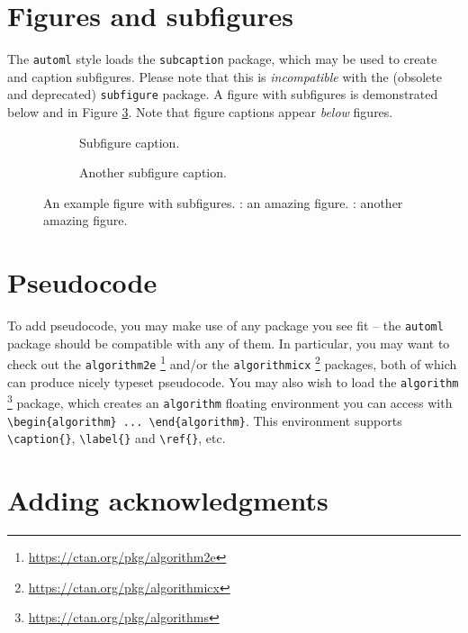 \documentclass[11pt]{article}
\begin{document}
\section{Figures and subfigures}

The \texttt{automl} style loads the \texttt{subcaption} package, which may be
used to create and caption subfigures. Please note that this is
\emph{incompatible} with the (obsolete and deprecated) \texttt{subfigure}
package. A figure with subfigures is demonstrated below and in Figure
\ref{example_figure}. Note that figure captions appear \emph{below} figures.

\begin{figure}
  \begin{subfigure}[t]{0.5\linewidth}
    \centering
    \caption{Subfigure caption.}
    \label{example_figure_left}
  \end{subfigure}
  \begin{subfigure}[t]{0.5\linewidth}
    \centering
    \caption{Another subfigure caption.}
    \label{example_figure_right}
  \end{subfigure}
  \caption{An example figure with subfigures. : an
    amazing figure. : another amazing figure.}
  \label{example_figure}
\end{figure}

\section{Pseudocode}
\label{sec:code}

To add pseudocode, you may make use of any package you see fit -- the
\texttt{automl} package should be compatible with any of them. In particular,
you may want to check out the \texttt{algorithm2e}%
%
\footnote{\url{https://ctan.org/pkg/algorithm2e}}
%
and/or the \texttt{algorithmicx}%
%
\footnote{\url{https://ctan.org/pkg/algorithmicx}}
%
packages, both of which can produce nicely typeset pseudocode. You may also wish
to load the \texttt{algorithm}%
%
\footnote{\url{https://ctan.org/pkg/algorithms}}
%
package, which creates an \texttt{algorithm} floating environment you can access
with \verb|\begin{algorithm} ... \end{algorithm}|. This environment supports
\verb|\caption{}|, \verb|\label{}| and \verb|\ref{}|, etc.

\section{Adding acknowledgments}
\end{document}
